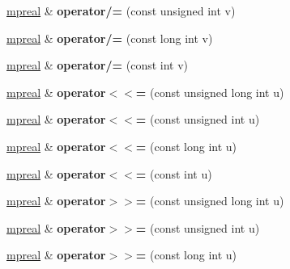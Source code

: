 \begin{DoxyCompactItemize}
\hyperlink{classmpfr_1_1mpreal}{mpreal} \& {\bfseries operator/=} (const unsigned int v)
\item 
\mbox{\label{classmpfr_1_1mpreal_a65e493fc03a3ac570c7be36daee98244}} 
\hyperlink{classmpfr_1_1mpreal}{mpreal} \& {\bfseries operator/=} (const long int v)
\item 
\mbox{\label{classmpfr_1_1mpreal_a0c58c9a6b793aadf3112ed463f7e80ee}} 
\hyperlink{classmpfr_1_1mpreal}{mpreal} \& {\bfseries operator/=} (const int v)
\item 
\mbox{\label{classmpfr_1_1mpreal_a060e29fef4785db0d7e0e8d1b975b7db}} 
\hyperlink{classmpfr_1_1mpreal}{mpreal} \& {\bfseries operator$<$$<$=} (const unsigned long int u)
\item 
\mbox{\label{classmpfr_1_1mpreal_a3638665d66d413bf342a88003707f21d}} 
\hyperlink{classmpfr_1_1mpreal}{mpreal} \& {\bfseries operator$<$$<$=} (const unsigned int u)
\item 
\mbox{\label{classmpfr_1_1mpreal_a52acaef1b725a696ecade7c67ef0c14a}} 
\hyperlink{classmpfr_1_1mpreal}{mpreal} \& {\bfseries operator$<$$<$=} (const long int u)
\item 
\mbox{\label{classmpfr_1_1mpreal_a706e769cbdd2bd2a19fd5713dd1d83a0}} 
\hyperlink{classmpfr_1_1mpreal}{mpreal} \& {\bfseries operator$<$$<$=} (const int u)
\item 
\mbox{\label{classmpfr_1_1mpreal_a8fb7e03e1b252c2042a1d1e2c4a5b8f0}} 
\hyperlink{classmpfr_1_1mpreal}{mpreal} \& {\bfseries operator$>$$>$=} (const unsigned long int u)
\item 
\mbox{\label{classmpfr_1_1mpreal_ae2cc092809d296f8afc25e7afe66bc0a}} 
\hyperlink{classmpfr_1_1mpreal}{mpreal} \& {\bfseries operator$>$$>$=} (const unsigned int u)
\item 
\mbox{\label{classmpfr_1_1mpreal_abdbd0bc30ce89e9a6255d9c7c1208124}} 
\hyperlink{classmpfr_1_1mpreal}{mpreal} \& {\bfseries operator$>$$>$=} (const long int u)
\item 

\end{DoxyCompactItemize}
